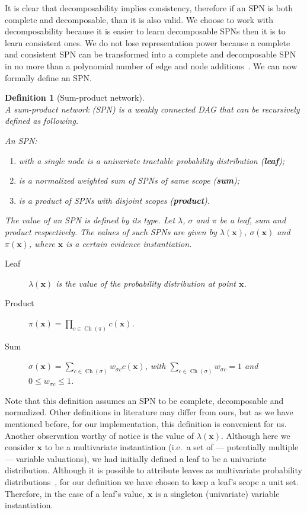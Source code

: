 \documentclass{amsart}
\DeclareMathOperator*{\Ch}{\text{Ch}}
\theoremstyle{plain}
\newcounter{dummy-def}\numberwithin{dummy-def}{section}
\newtheorem{definition}[dummy-def]{Definition}
\newcounter{dummy-thm}\numberwithin{dummy-thm}{section}
\newcounter{dummy-prop}\numberwithin{dummy-prop}{section}
\newcounter{dummy-corollary}\numberwithin{dummy-corollary}{section}
\newcounter{dummy-lemma}\numberwithin{dummy-lemma}{section}
\newcounter{dummy-ex}\numberwithin{dummy-ex}{section}
\newcounter{dummy-eg}\numberwithin{dummy-eg}{section}
\numberwithin{equation}{section}
\begin{document}
It is clear that decomposability implies consistency, therefore if an SPN is both complete and
decomposable, than it is also valid. We choose to work with decomposability because it is easier to
learn decomposable SPNs then it is to learn consistent ones. We do not lose representation power
because a complete and consistent SPN can be transformed into a complete and decomposable SPN in no
more than a polynomial number of edge and node additions~\cite{theoretical-spn}. We can now
formally define an SPN\@.

\begin{definition}[Sum-product network]\label{def:spn}~\\
  A sum-product network (SPN) is a weakly connected DAG that can be recursively defined as
  following.

  An SPN\@:
  \begin{enumerate}
    \item with a single node is a univariate tractable probability distribution (\textbf{leaf});
    \item is a normalized weighted sum of SPNs of same scope (\textbf{sum});
    \item is a product of SPNs with disjoint scopes (\textbf{product}).
  \end{enumerate}
  The value of an SPN is defined by its type. Let $\lambda$, $\sigma$ and $\pi$ be a leaf, sum and
  product respectively. The values of such SPNs are given by $\lambda(\mathbf{x})$,
  $\sigma(\mathbf{x})$ and $\pi(\mathbf{x})$, where $\mathbf{x}$ is a certain evidence
  instantiation.
  \begin{description}
    \item[Leaf] $\lambda(\mathbf{x})$ is the value of the probability distribution at point
      $\mathbf{x}$.
    \item[Product] $\pi(\mathbf{x}) = \prod_{c \in \Ch(\pi)} c(\mathbf{x})$.
    \item[Sum] $\sigma(\mathbf{x}) = \sum_{c \in \Ch(\sigma)} w_{\sigma c} c(\mathbf{x})$, with
      $\sum_{c \in \Ch(\sigma)} w_{\sigma c} = 1$ and $0 \leq w_{\sigma c} \leq 1$.
  \end{description}
\end{definition}

Note that this definition assumes an SPN to be complete, decomposable and normalized. Other
definitions in literature may differ from ours, but as we have mentioned before, for our
implementation, this definition is convenient for us. Another observation worthy of notice is the
value of $\lambda(\mathbf{x})$. Although here we consider $\mathbf{x}$ to be a multivariate
instantiation (i.e.\ a set of --- potentially multiple --- variable valuations), we had initially
defined a leaf to be a univariate distribution. Although it is possible to attribute leaves as
multivariate probability distributions~\cite{id-spn}, for our definition we have chosen to keep a
leaf's scope a unit set. Therefore, in the case of a leaf's value, $\mathbf{x}$ is a singleton
(univariate) variable instantiation.
\end{document}
